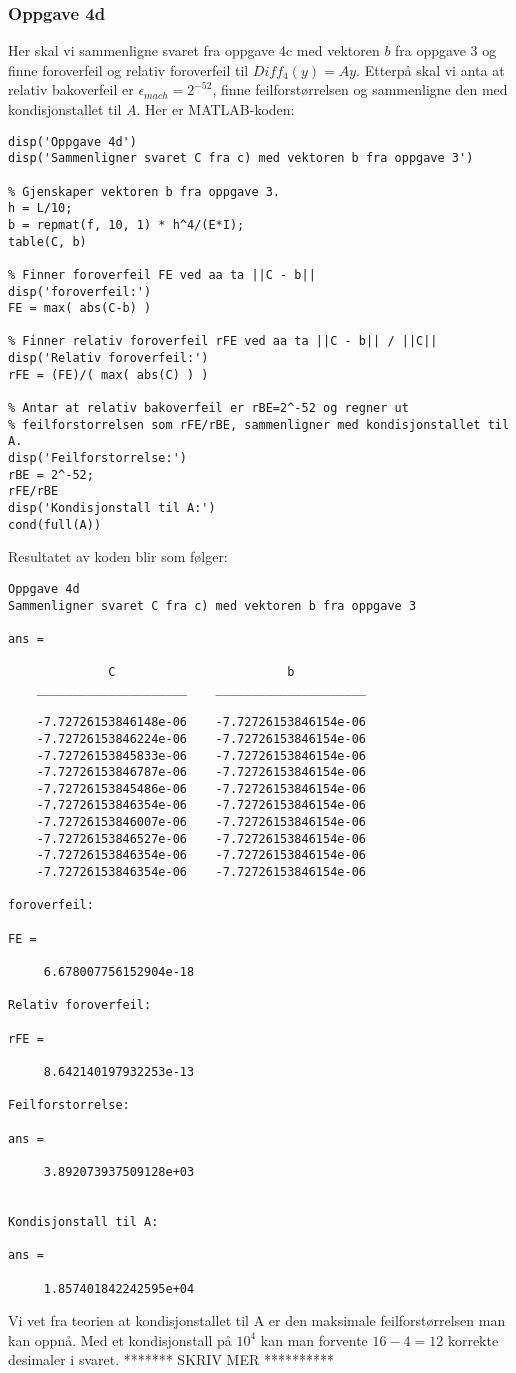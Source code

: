 \subsubsection{Oppgave 4d}
Her skal vi sammenligne svaret fra oppgave 4c med vektoren $b$ fra oppgave 3 og finne foroverfeil og relativ foroverfeil til $Diff_4(y)= Ay$. Etterpå skal vi anta at relativ bakoverfeil er $\epsilon_{mach} = 2^{-52}$, finne feilforstørrelsen og sammenligne den med kondisjonstallet til $A$. Her er MATLAB-koden:
\begin{lstlisting}
disp('Oppgave 4d')
disp('Sammenligner svaret C fra c) med vektoren b fra oppgave 3')

% Gjenskaper vektoren b fra oppgave 3.
h = L/10;
b = repmat(f, 10, 1) * h^4/(E*I);
table(C, b)

% Finner foroverfeil FE ved aa ta ||C - b||
disp('foroverfeil:')
FE = max( abs(C-b) )

% Finner relativ foroverfeil rFE ved aa ta ||C - b|| / ||C||
disp('Relativ foroverfeil:')
rFE = (FE)/( max( abs(C) ) )

% Antar at relativ bakoverfeil er rBE=2^-52 og regner ut
% feilforstorrelsen som rFE/rBE, sammenligner med kondisjonstallet til A.
disp('Feilforstorrelse:')
rBE = 2^-52;
rFE/rBE
disp('Kondisjonstall til A:')
cond(full(A))
\end{lstlisting}
Resultatet av koden blir som følger:
\begin{lstlisting}
Oppgave 4d
Sammenligner svaret C fra c) med vektoren b fra oppgave 3

ans = 

              C                        b          
    _____________________    _____________________

    -7.72726153846148e-06    -7.72726153846154e-06
    -7.72726153846224e-06    -7.72726153846154e-06
    -7.72726153845833e-06    -7.72726153846154e-06
    -7.72726153846787e-06    -7.72726153846154e-06
    -7.72726153845486e-06    -7.72726153846154e-06
    -7.72726153846354e-06    -7.72726153846154e-06
    -7.72726153846007e-06    -7.72726153846154e-06
    -7.72726153846527e-06    -7.72726153846154e-06
    -7.72726153846354e-06    -7.72726153846154e-06
    -7.72726153846354e-06    -7.72726153846154e-06

foroverfeil:

FE =

     6.678007756152904e-18

Relativ foroverfeil:

rFE =

     8.642140197932253e-13

Feilforstorrelse:

ans =

     3.892073937509128e+03
     

Kondisjonstall til A:

ans =

     1.857401842242595e+04
\end{lstlisting}
Vi vet fra teorien at kondisjonstallet til A er den maksimale feilforstørrelsen man kan oppnå. Med et kondisjonstall på $10^4$ kan man forvente $16-4=12$ korrekte desimaler i svaret. ******* SKRIV MER **********

